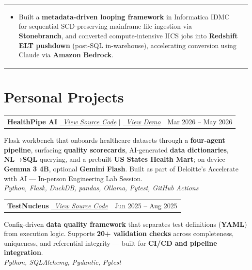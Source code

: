 \documentclass[a4paper,8pt]{article}
\begin{document}
\begin{tabularx}{\linewidth}{ @{}l r@{} }
\begin{minipage}[t]{\linewidth}
\begin{itemize}[nosep,after=\strut, leftmargin=2em, itemsep=2pt]
        \item Built a \textbf{metadata-driven looping framework} in Informatica IDMC for sequential SCD-preserving mainframe file ingestion via \textbf{Stonebranch}, and converted compute-intensive IICS jobs into \textbf{Redshift ELT pushdown} (post-SQL in-warehouse), accelerating conversion using Claude via \textbf{Amazon Bedrock}.
    \end{itemize}
\end{minipage}
\end{tabularx}

\section{Personal Projects}

\begin{tabularx}{\linewidth}{ @{}X r@{} }
\textbf{HealthPipe AI} {\small\textit{\color[HTML]{371e77}\href{https://github.com/Kaustav-Purkayastha/healthpipe_ai}{\raisebox{-0.05\height}{\faGithub}\ \uline{View Source Code}}}} {\small\textit{\color[HTML]{371e77}$|$ \href{https://www.youtube.com/watch?v=hUgf_1fDD_4}{\raisebox{-0.05\height}{\faYoutube}\ \uline{View Demo}}}} & \color[HTML]{371e77} Mar 2026 -- May 2026 \\
\end{tabularx}\par\vspace{2pt}
Flask workbench that onboards healthcare datasets through a \textbf{four-agent pipeline}, surfacing \textbf{quality scorecards}, AI-generated \textbf{data dictionaries}, \textbf{NL→SQL} querying, and a prebuilt \textbf{US States Health Mart}; on-device \textbf{Gemma 3 4B}, optional \textbf{Gemini Flash}. Built as part of Deloitte's Accelerate with AI --- In-person Engineering Lab Session.\\[2pt]
\textit{Python, Flask, DuckDB, pandas, Ollama, Pytest, GitHub Actions}

\vspace{5pt}

\begin{tabularx}{\linewidth}{ @{}X r@{} }
\textbf{TestNucleus} {\small\textit{\color[HTML]{371e77}\href{https://github.com/Kaustav-Purkayastha/TestNucleus}{\raisebox{-0.05\height}{\faGithub}\ \uline{View Source Code}}}} & \color[HTML]{371e77} Jun 2025 -- Aug 2025 \\
\end{tabularx}\par\vspace{2pt}
Config-driven \textbf{data quality framework} that separates test definitions (\textbf{YAML}) from execution logic. Supports \textbf{20+ validation checks} across completeness, uniqueness, and referential integrity --- built for \textbf{CI/CD and pipeline integration}.\\[2pt]
\textit{Python, SQLAlchemy, Pydantic, Pytest}
\end{document}

